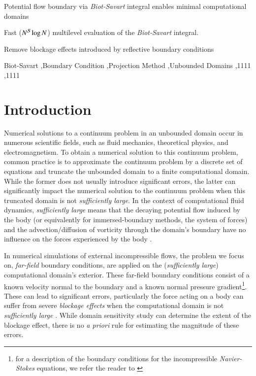 \documentclass[preprint,12pt]{elsarticle}
\begin{document}
\begin{frontmatter}
\begin{highlights}
\item Potential flow boundary via \emph{Biot-Savart} integral enables minimal computational domains
\item Fast ($N^{\cal S}\log N$) multilevel evaluation of the \emph{Biot-Savart} integral.
\item Remove blockage effects introduced by reflective boundary conditions
\end{highlights}

\begin{keyword}
Biot-Savart \sep Boundary Condition \sep Projection Method \sep Unbounded Domains
 \sep 1111
 \sep 1111
\end{keyword}

\end{frontmatter}



\section{Introduction}
Numerical solutions to a continuum problem in an unbounded domain occur in numerous scientific fields, such as fluid mechanics, theoretical physics, and electromagnetism. To obtain a numerical solution to this continuum problem, common practice is to approximate the continuum problem by a discrete set of equations and truncate the unbounded domain to a finite computational domain. While the former does not usually introduce significant errors, the latter can significantly impact the numerical solution to the continuum problem when this truncated domain is not \emph{sufficiently large}. In the context of computational fluid dynamics, \emph{sufficiently large} means that the decaying potential flow induced by the body (or equivalently for immersed-boundary methods, the system of forces) and the advection/diffusion of vorticity through the domain's boundary have no influence on the forces experienced by the body \cite{Colonius2008}.

In numerical simulations of external incompressible flows, the problem we focus on, \emph{far-field} boundary conditions, are applied on the (\emph{sufficiently large}) computational domain's exterior. These far-field boundary conditions consist of a known velocity normal to the boundary and a known normal pressure gradient\footnote{for a description of the boundary conditions for the incompressible \emph{Navier-Stokes} equations, we refer the reader to \cite{Gresho1987}}. These can lead to significant errors, particularly the force acting on a body can suffer from severe \emph{blockage effects} when the computational domain is not \emph{sufficiently large} \cite{Colonius2008}. While domain sensitivity study can determine the extent of the blockage effect, there is no \emph{a priori} rule for estimating the magnitude of these errors.
\end{document}
